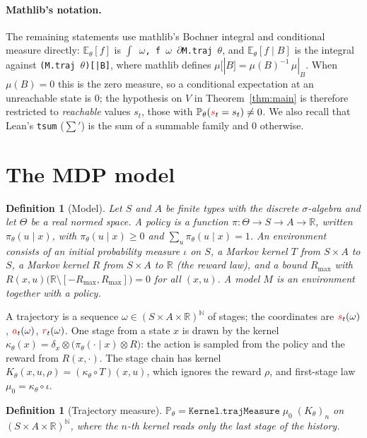 \documentclass[11pt,a4paper]{article}
\newtheorem{definition}[theorem]{Definition}
\newcommand{\R}{\mathbb{R}}
\newcommand{\N}{\mathbb{N}}
\newcommand{\E}{\mathbb{E}}
\newcommand{\Prb}{\mathbb{P}}
\newcommand{\rv}[1]{{\color{red}#1}}       %
\newcommand{\sv}{\rv{s}}
\newcommand{\av}{\rv{a}}
\newcommand{\rw}{\rv{r}}
\newcommand{\tsum}{\textstyle\sum'}
\begin{document}
\paragraph{Mathlib's notation.}
The remaining statements use mathlib's Bochner integral and conditional measure directly:
$\E_\theta[f]$ is \texttt{$\int$ $\omega$, f $\omega$ $\partial$M.traj $\theta$}, and $\E_\theta[f\mid B]$ is the integral against \texttt{(M.traj $\theta$)[|B]}, where mathlib defines $\mu[|B]=\mu(B)^{-1}\,\mu|_B$.
When $\mu(B)=0$ this is the zero measure, so a conditional expectation at an unreachable state is $0$; the hypothesis on $V$ in Theorem~\ref{thm:main} is therefore restricted to \emph{reachable} values $s_t$, those with $\Prb_\theta(\sv_t=s_t)\neq0$.
We also recall that Lean's \texttt{tsum} ($\tsum$) is the sum of a summable family and $0$ otherwise.

\section{The MDP model}
\label{sec:model}

\begin{definition}[Model]
\label{def:model}
Let $S$ and $A$ be finite types with the discrete $\sigma$-algebra and let $\Theta$ be a real normed space.
A \emph{policy} is a function $\pi:\Theta\to S\to A\to\R$, written $\pi_\theta(u\mid x)$, with $\pi_\theta(u\mid x)\ge0$ and $\sum_u\pi_\theta(u\mid x)=1$.
An \emph{environment} consists of an initial probability measure $\iota$ on $S$, a Markov kernel $T$ from $S\times A$ to $S$, a Markov kernel $R$ from $S\times A$ to $\R$ (the reward law), and a bound $R_{\max}$ with $R(x,u)\bigl(\R\setminus[-R_{\max},R_{\max}]\bigr)=0$ for all $(x,u)$.
A model $M$ is an environment together with a policy.
\end{definition}

A trajectory is a sequence $\omega\in(S\times A\times\R)^{\N}$ of stages; the coordinates are $\sv_t(\omega)$, $\av_t(\omega)$, $\rw_t(\omega)$.
One stage from a state $x$ is drawn by the kernel
$\kappa_\theta(x)=\delta_x\otimes\bigl(\pi_\theta(\cdot\mid x)\otimes R\bigr)$: the action is sampled from the policy and the reward from $R(x,\cdot)$.
The stage chain has kernel $K_\theta(x,u,\rho)=(\kappa_\theta\circ T)(x,u)$, which ignores the reward $\rho$, and first-stage law $\mu_0=\kappa_\theta\circ\iota$.

\begin{definition}[Trajectory measure]
$\Prb_\theta=\mathtt{Kernel.trajMeasure}\;\mu_0\;(K_\theta)_n$ on $(S\times A\times\R)^{\N}$, where the $n$-th kernel reads only the last stage of the history.
\end{definition}
\end{document}
